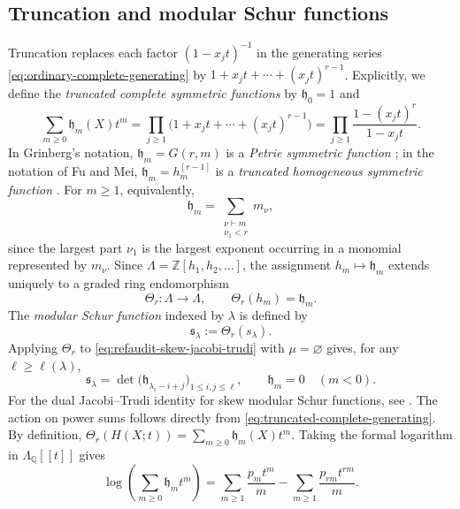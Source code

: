 \documentclass[12pt,reqno,a4paper]{amsart}
\numberwithin{equation}{section}
\numberwithin{figure}{section}
\theoremstyle{plain}
\theoremstyle{definition}
\begin{document}
\subsection{Truncation and modular Schur functions}
\label{subsec:modular-schur-functions}
Truncation replaces each factor $(1-x_jt)^{-1}$ in the generating
series \eqref{eq:ordinary-complete-generating} by
$1+x_jt+\cdots+(x_jt)^{r-1}$.  Explicitly, we define
the \emph{truncated complete symmetric functions} by $\mathfrak{h}_0=1$ and
\begin{equation}\label{eq:truncated-complete-generating}
\sum_{m\geq0}\mathfrak{h}_m(X)t^m
=\prod_{j\geq1}\bigl(1+x_jt+\cdots+(x_jt)^{r-1}\bigr)
=\prod_{j\geq1}\frac{1-(x_jt)^r}{1-x_jt}.
\end{equation}
In Grinberg's notation, $\mathfrak{h}_m=G(r,m)$ is a \emph{Petrie symmetric
function} \cite[Definition~2.1(b)]{Grinberg}; in the notation of Fu and
Mei, $\mathfrak{h}_m=h_m^{[r-1]}$ is a \emph{truncated homogeneous symmetric
function} \cite[equation~(1)]{FuMei}.
For $m\geq1$, equivalently,
\[
\mathfrak{h}_m=\sum_{\substack{\nu\vdash m\\\nu_1<r}}m_\nu,
\]
since the largest part $\nu_1$ is the largest exponent occurring in
a monomial represented by $m_\nu$.  Since
$\Lambda=\mathbb Z[h_1,h_2,\ldots]$, the assignment $h_m\mapsto \mathfrak{h}_m$
extends uniquely to a graded ring endomorphism
\[
\Theta_r:\Lambda\longrightarrow\Lambda,
\qquad \Theta_r(h_m)=\mathfrak{h}_m.
\]
The \emph{modular Schur function} indexed by \(\lambda\) is defined by
\begin{equation}\label{eq:modular-schur-definition}
\mathfrak{s}_\lambda:=\Theta_r(s_\lambda).
\end{equation}
Applying $\Theta_r$ to \eqref{eq:refaudit-skew-jacobi-trudi} with
$\mu=\varnothing$ gives, for any $\ell\geq\ell(\lambda)$,
\begin{equation}\label{eq:refaudit-modular-jacobi-trudi}
\mathfrak{s}_\lambda
=\det\bigl(\mathfrak{h}_{\lambda_i-i+j}\bigr)_{1\leq i,j\leq\ell},
\qquad \mathfrak{h}_m=0\quad(m<0).
\end{equation}
For the dual Jacobi--Trudi identity for skew modular Schur functions,
see \cite[Theorem~3.2]{Hamel}.
The action on power sums follows directly from
\eqref{eq:truncated-complete-generating}.  By definition,
$\Theta_r(H(X;t))=\sum_{m\geq0}\mathfrak{h}_m(X)t^m$.  Taking the formal
logarithm in $\Lambda_{\mathbb Q}[[t]]$ gives
\begin{equation}\label{eq:refaudit-truncated-logarithm}
\log\!\left(\sum_{m\geq0}\mathfrak{h}_m t^m\right)
=\sum_{m\geq1}\frac{p_m t^m}{m}
-\sum_{m\geq1}\frac{p_{rm}t^{rm}}{m}.
\end{equation}
\end{document}
